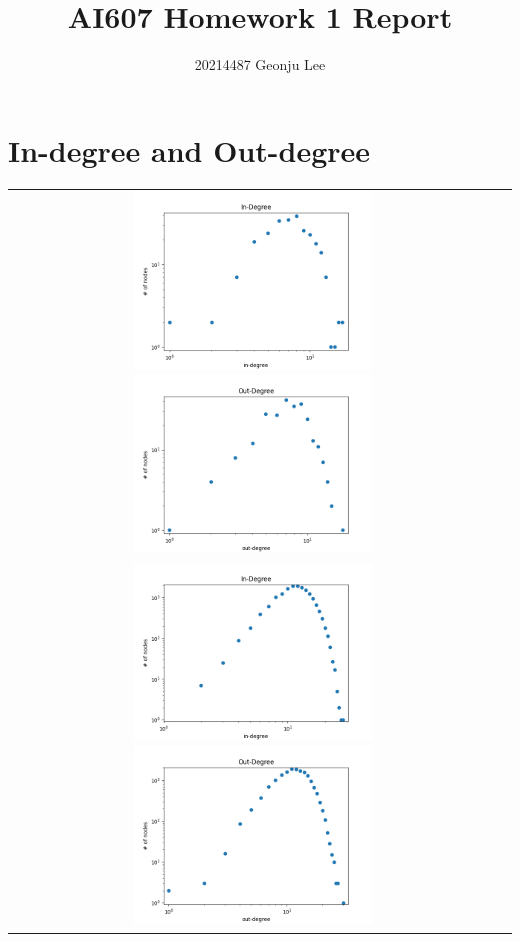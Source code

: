\documentclass[12pt, letterpaper, twoside]{article}
\title{AI607 Homework 1 Report}
\author{20214487 Geonju Lee}
\date{}
\begin{document}
\maketitle

\section{In-degree and Out-degree}

\begin{center}
\begin{longtable}{ c c }  
    \includegraphics[width=0.5\textwidth]{1S_indeg.png} \includegraphics[width=0.5\textwidth]{1S_outdeg.png} \\
    \includegraphics[width=0.5\textwidth]{1L_indeg.png} \includegraphics[width=0.5\textwidth]{1L_outdeg.png} \\

\end{longtable}
\end{center}
\end{document}
